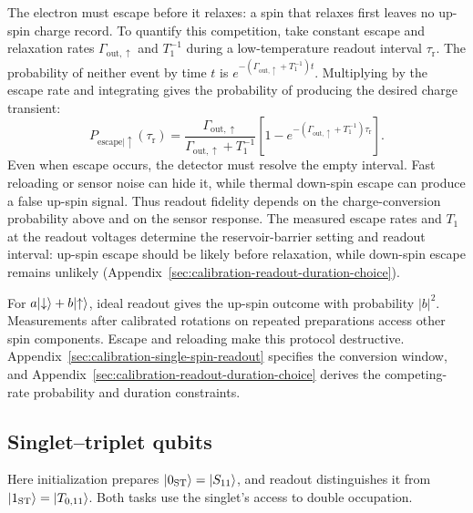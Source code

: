 The electron must escape before it relaxes: a spin that relaxes first
leaves no up-spin charge record. To quantify this competition, take
constant escape and relaxation rates
$\Gamma_{\mathrm{out},\uparrow}$ and $T_1^{-1}$
during a low-temperature readout interval $\tau_{\mathrm r}$.
The probability of neither event by time $t$ is
$e^{-(\Gamma_{\mathrm{out},\uparrow}+T_1^{-1})t}$.
Multiplying by the escape rate and integrating gives the probability
of producing the desired charge transient:
\begin{equation}
  P_{\mathrm{escape}|\uparrow}(\tau_{\mathrm r})
    =\frac{\Gamma_{\mathrm{out},\uparrow}}
           {\Gamma_{\mathrm{out},\uparrow}+T_1^{-1}}
      \left[1-e^{-(\Gamma_{\mathrm{out},\uparrow}+T_1^{-1})\tau_{\mathrm r}}\right].
  \label{eq:readout-competing-rates}
\end{equation}
Even when escape occurs, the detector must resolve the empty interval.
Fast reloading or sensor noise can hide it, while thermal down-spin
escape can produce a false up-spin signal.
Thus readout fidelity depends on the charge-conversion probability
above and on the sensor response. The measured escape rates and
$T_1$ at the readout voltages determine the reservoir-barrier setting
and readout interval: up-spin escape should be likely before
relaxation, while down-spin escape remains unlikely
(Appendix~\ref{sec:calibration-readout-duration-choice}).

For $a\lvert \downarrow\rangle+b\lvert \uparrow\rangle$, ideal readout gives the
up-spin outcome with probability $|b|^2$. Measurements after
calibrated rotations on repeated preparations access other spin
components. Escape and reloading make this protocol destructive.
Appendix~\ref{sec:calibration-single-spin-readout} specifies the
conversion window, and Appendix~\ref{sec:calibration-readout-duration-choice}
derives the competing-rate probability and duration constraints.

\subsection{Singlet--triplet qubits}
\label{sec:st-spam}
\label{sec:pauli-blockade-readout}

Here initialization prepares $\lvert 0_{\mathrm{ST}}\rangle=\lvert S_{11}\rangle$,
and readout distinguishes it from $\lvert 1_{\mathrm{ST}}\rangle=\lvert T_{0,11}\rangle$.
Both tasks use the singlet's access to double occupation.

